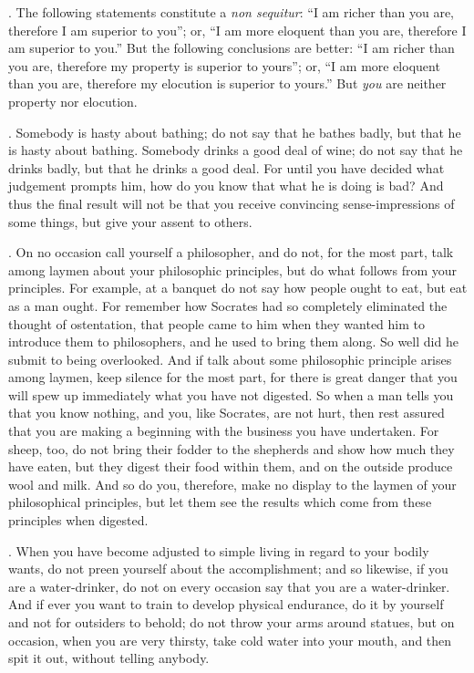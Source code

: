 . The following statements constitute a \emph{non sequitur}: ``I am richer than you are, therefore I am superior to you''; or, ``I am more eloquent than you are, therefore I am superior to you.'' But the following conclusions are better: ``I am richer than you are, therefore my property is superior to yours''; or, ``I am more eloquent than you are, therefore my elocution is superior to yours.'' But \emph{you} are neither property nor elocution.

. Somebody is hasty about bathing; do not say that he bathes badly, but that he is hasty about bathing. Somebody drinks a good deal of wine; do not say that he drinks badly, but that he drinks a good deal. For until you have decided what judgement prompts him, how do you know that what he is doing is bad? And thus the final result will not be that you receive convincing sense-impressions of some things, but give your assent to others.

. On no occasion call yourself a philosopher, and do not, for the most part, talk among laymen about your philosophic principles, but do what follows from your principles. For example, at a banquet do not say how people ought to eat, but eat as a man ought. For remember how Socrates had so completely eliminated the thought of ostentation, that people came to him when they wanted him to introduce them to philosophers, and he used to bring them along. So well did he submit to being overlooked. And if talk about some philosophic principle arises among laymen, keep silence for the most part, for there is great danger that you will spew up immediately what you have not digested. So when a man tells you that you know nothing, and you, like Socrates, are not hurt, then rest assured that you are making a beginning with the business you have undertaken. For sheep, too, do not bring their fodder to the shepherds and show how much they have eaten, but they digest their food within them, and on the outside produce wool and milk. And so do you, therefore, make no display to the laymen of your philosophical principles, but let them see the results which come from these principles when digested.

. When you have become adjusted to simple living in regard to your bodily wants, do not preen yourself about the accomplishment; and so likewise, if you are a water-drinker, do not on every occasion say that you are a water-drinker. And if ever you want to train to develop physical endurance, do it by yourself and not for outsiders to behold; do not throw your arms around statues, but on occasion, when you are very thirsty, take cold water into your mouth, and then spit it out, without telling anybody.

